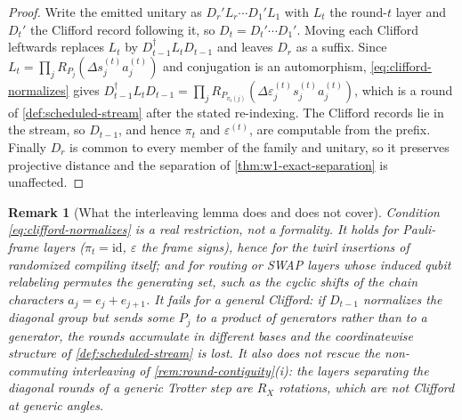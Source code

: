 \documentclass[aps,prx,reprint,floatfix,superscriptaddress]{revtex4-2}
\newtheorem{remark}{Remark}
\begin{document}
\begin{proof}
Write the emitted unitary as $D_r'L_r\cdots D_1'L_1$ with $L_t$ the
round-$t$ layer and $D_t'$ the Clifford record following it, so
$D_t=D_t'\cdots D_1'$.  Moving each Clifford leftwards replaces $L_t$ by
$D_{t-1}^\dagger L_tD_{t-1}$ and leaves $D_r$ as a suffix.  Since
$L_t=\prod_jR_{P_j}(\Delta s_j^{(t)}a_j^{(t)})$ and conjugation is an
automorphism, \eqref{eq:clifford-normalizes} gives
$D_{t-1}^\dagger L_tD_{t-1}
=\prod_jR_{P_{\pi_t(j)}}(\Delta\varepsilon_j^{(t)}s_j^{(t)}a_j^{(t)})$,
which is a round of \cref{def:scheduled-stream} after the stated
re-indexing.  The Clifford records lie in the stream, so $D_{t-1}$, and
hence $\pi_t$ and $\varepsilon^{(t)}$, are computable from the prefix.
Finally $D_r$ is common to every member of the family and unitary, so it
preserves projective distance and the separation of
\cref{thm:w1-exact-separation} is unaffected.
\end{proof}

\begin{remark}[What the interleaving lemma does and does not cover]
\label{rem:clifford-scope}
Condition \eqref{eq:clifford-normalizes} is a real restriction, not a
formality.  It holds for Pauli-frame layers ($\pi_t=\mathrm{id}$,
$\varepsilon$ the frame signs), hence for the twirl insertions of
randomized compiling itself; and for routing or SWAP layers
whose induced qubit relabeling permutes the generating set, such as the
cyclic shifts of the chain characters $a_j=e_j+e_{j+1}$.  It fails for a
general Clifford: if $D_{t-1}$ normalizes the diagonal group but sends
some $P_j$ to a product of generators rather than to a generator, the
rounds accumulate in different bases and the coordinatewise structure of
\cref{def:scheduled-stream} is lost.  It also does not rescue the
non-commuting interleaving of \cref{rem:round-contiguity}(i): the
layers separating the diagonal rounds of a generic Trotter step are
$R_X$ rotations, which are not Clifford at generic angles.
\end{remark}
\end{document}
